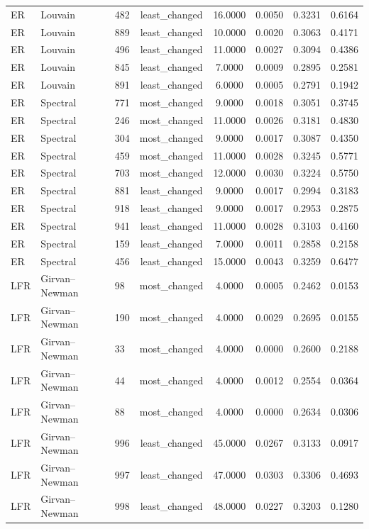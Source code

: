 \begin{longtable}{lllccccc}
ER & Louvain & 482 & least\_changed & 16.0000 & 0.0050 & 0.3231 & 0.6164 \\
ER & Louvain & 889 & least\_changed & 10.0000 & 0.0020 & 0.3063 & 0.4171 \\
ER & Louvain & 496 & least\_changed & 11.0000 & 0.0027 & 0.3094 & 0.4386 \\
ER & Louvain & 845 & least\_changed & 7.0000 & 0.0009 & 0.2895 & 0.2581 \\
ER & Louvain & 891 & least\_changed & 6.0000 & 0.0005 & 0.2791 & 0.1942 \\
ER & Spectral & 771 & most\_changed & 9.0000 & 0.0018 & 0.3051 & 0.3745 \\
ER & Spectral & 246 & most\_changed & 11.0000 & 0.0026 & 0.3181 & 0.4830 \\
ER & Spectral & 304 & most\_changed & 9.0000 & 0.0017 & 0.3087 & 0.4350 \\
ER & Spectral & 459 & most\_changed & 11.0000 & 0.0028 & 0.3245 & 0.5771 \\
ER & Spectral & 703 & most\_changed & 12.0000 & 0.0030 & 0.3224 & 0.5750 \\
ER & Spectral & 881 & least\_changed & 9.0000 & 0.0017 & 0.2994 & 0.3183 \\
ER & Spectral & 918 & least\_changed & 9.0000 & 0.0017 & 0.2953 & 0.2875 \\
ER & Spectral & 941 & least\_changed & 11.0000 & 0.0028 & 0.3103 & 0.4160 \\
ER & Spectral & 159 & least\_changed & 7.0000 & 0.0011 & 0.2858 & 0.2158 \\
ER & Spectral & 456 & least\_changed & 15.0000 & 0.0043 & 0.3259 & 0.6477 \\
LFR & Girvan--Newman & 98 & most\_changed & 4.0000 & 0.0005 & 0.2462 & 0.0153 \\
LFR & Girvan--Newman & 190 & most\_changed & 4.0000 & 0.0029 & 0.2695 & 0.0155 \\
LFR & Girvan--Newman & 33 & most\_changed & 4.0000 & 0.0000 & 0.2600 & 0.2188 \\
LFR & Girvan--Newman & 44 & most\_changed & 4.0000 & 0.0012 & 0.2554 & 0.0364 \\
LFR & Girvan--Newman & 88 & most\_changed & 4.0000 & 0.0000 & 0.2634 & 0.0306 \\
LFR & Girvan--Newman & 996 & least\_changed & 45.0000 & 0.0267 & 0.3133 & 0.0917 \\
LFR & Girvan--Newman & 997 & least\_changed & 47.0000 & 0.0303 & 0.3306 & 0.4693 \\
LFR & Girvan--Newman & 998 & least\_changed & 48.0000 & 0.0227 & 0.3203 & 0.1280 \\

\end{longtable}
